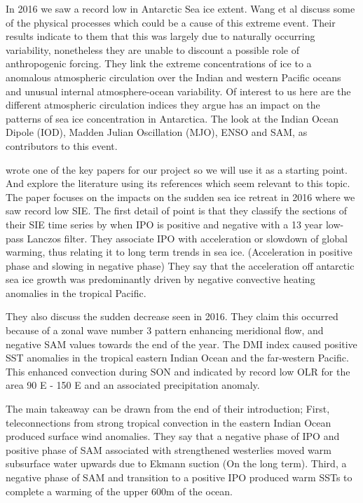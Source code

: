 \documentclass[../main.tex]{subfiles}
\begin{document}
In 2016 we saw a record low in Antarctic Sea ice extent. Wang et al \cite{Wang2019} discuss some of the physical processes which could be a cause of this extreme event. Their results indicate to them that this was largely due to naturally occurring variability, nonetheless they are unable to discount a possible role of anthropogenic forcing. They link the extreme concentrations of ice to a anomalous atmospheric circulation over the Indian and western Pacific oceans and unusual internal atmosphere-ocean variability. Of interest to us here are the different atmospheric circulation indices they argue has an impact on the patterns of sea ice concentration in Antarctica. The look at the Indian Ocean Dipole (IOD), Madden Julian Oscillation (MJO), ENSO and SAM, as contributors to this event.


\cite{Meehl2016} wrote one of the key papers for our project so we will use it as a starting point. And explore the literature using its references which seem relevant to this topic. The paper focuses on the impacts on the sudden sea ice retreat in 2016 where we saw record low SIE. The first detail of point is that they classify the sections of their SIE time series by when IPO is positive and negative with a 13 year low-pass Lanczos filter. They associate IPO with acceleration or slowdown of global warming, thus relating it to long term trends in sea ice. (Acceleration in positive phase and slowing in negative phase) They say that the acceleration off antarctic sea ice growth was predominantly driven by negative convective heating anomalies in the tropical Pacific.

They also discuss the sudden decrease seen in 2016. They claim this occurred because of a zonal wave number 3 pattern enhancing meridional flow, and negative SAM values towards the end of the year. The DMI index caused positive SST anomalies in the tropical eastern Indian Ocean and the far-western Pacific. This enhanced convection during SON and indicated by record low OLR for the area 90 E - 150 E and an associated precipitation anomaly.

The main takeaway can be drawn from the end of their introduction; First, teleconnections from strong tropical convection in the eastern Indian Ocean produced surface wind anomalies.
They say that a negative phase of IPO and positive phase of SAM associated with strengthened westerlies moved warm subsurface water upwards due to Ekmann suction (On the long term). Third, a negative phase of SAM and transition to a positive IPO produced warm SSTs to complete a warming of the upper 600m of the ocean.
\medskip
\end{document}
